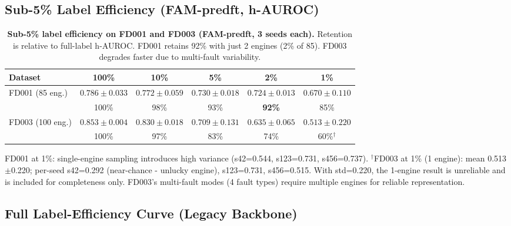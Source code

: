 \documentclass{article}
\begin{document}
\subsection{Sub-5\% Label Efficiency (FAM-predft, h-AUROC)}
\label{app:sub5pct}

\begin{table}[h]
  \centering
  \caption{\textbf{Sub-5\% label efficiency on FD001 and FD003 (FAM-predft, 3 seeds each).} Retention is relative to full-label h-AUROC. FD001 retains 92\% with just 2 engines (2\% of 85). FD003 degrades faster due to multi-fault variability.}
  \label{tab:sub5pct}
  \small
  \begin{tabular}{lccccc}
    \toprule
    Dataset          & 100\%             & 10\%              & 5\%               & 2\%                        & 1\%               \\
    \midrule
    FD001 (85 eng.)  & $0.786 \pm 0.033$ & $0.772 \pm 0.059$ & $0.730 \pm 0.018$ & $\mathbf{0.724 \pm 0.013}$ & $0.670 \pm 0.110$ \\
                     & 100\%             & 98\%              & 93\%              & \textbf{92\%}              & 85\%              \\
    \midrule
    FD003 (100 eng.) & $0.853 \pm 0.004$ & $0.830 \pm 0.018$ & $0.709 \pm 0.131$ & $0.635 \pm 0.065$          & $0.513 \pm 0.220$ \\
                     & 100\%             & 97\%              & 83\%              & 74\%                       & 60\%$^\dagger$    \\
    \bottomrule
  \end{tabular}
  \vspace{2pt}
  \begin{minipage}{\linewidth}
    \scriptsize
    FD001 at 1\%: single-engine sampling introduces high variance (s42=0.544, s123=0.731, s456=0.737). $^\dagger$FD003 at 1\% (1 engine): mean 0.513$\pm$0.220; per-seed s42=0.292 (near-chance - unlucky engine), s123=0.731, s456=0.515. With std=0.220, the 1-engine result is unreliable and is included for completeness only. FD003's multi-fault modes (4 fault types) require multiple engines for reliable representation.
  \end{minipage}
\end{table}

\subsection{Full Label-Efficiency Curve (Legacy Backbone)}
\label{app:label_efficiency_full}
\end{document}
